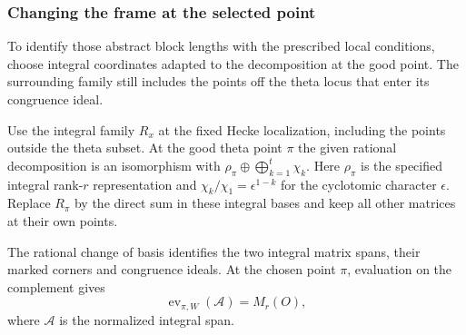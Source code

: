 \subsubsection*{Changing the frame at the selected point}
\label{subsec:split-selmer}
\hypertarget{source-split-selmer}{}

To identify those abstract block lengths with the prescribed local conditions, choose integral coordinates adapted to the decomposition at the good point. The surrounding family still includes the points off the theta locus that enter its congruence ideal.

Use the integral family \(R_x\) at the fixed Hecke
localization, including the points outside the theta subset.
At the good theta point \(\pi\) the given rational decomposition
is an isomorphism with \(\rho_\pi\oplus\bigoplus_{k=1}^t\chi_k\).
Here \(\rho_\pi\) is the specified integral rank-\(r\) representation
and \(\chi_k/\chi_1=\epsilon^{1-k}\) for the cyclotomic character
\(\epsilon\). Replace \(R_\pi\) by the direct sum in these
integral bases and keep all other matrices at their own points.
\begin{lemma}
The rational change of basis identifies the two integral matrix
spans, their marked corners and congruence ideals. At the chosen point \(\pi\), evaluation on the complement gives
\[
 \operatorname{ev}_{\pi,W}(\mathcal A)=M_r(O),
\]
where \(\mathcal A\) is the normalized integral span.
\end{lemma}
